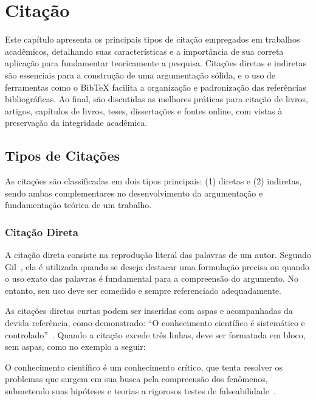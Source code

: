 \documentclass[
    12pt
    ,oneside
    ,a4paper
    ,chapter=TITLE
    ,section=TITLE
    ,sumario=abnt-6027-2012]{abntex2}
\begin{document}
\chapter{Citação}
\label{cap:citacao}

Este capítulo apresenta os principais tipos de citação empregados em trabalhos acadêmicos, detalhando suas características e a importância de sua correta aplicação para fundamentar teoricamente a pesquisa. Citações diretas e indiretas são essenciais para a construção de uma argumentação sólida, e o uso de ferramentas como o BibTeX facilita a organização e padronização das referências bibliográficas. Ao final, são discutidas as melhores práticas para citação de livros, artigos, capítulos de livros, teses, dissertações e fontes online, com vistas à preservação da integridade acadêmica.

\section{Tipos de Citações}

As citações são classificadas em dois tipos principais: (1) diretas e (2) indiretas, sendo ambas complementares no desenvolvimento da argumentação e fundamentação teórica de um trabalho.

\subsection{Citação Direta}

A citação direta consiste na reprodução literal das palavras de um autor. Segundo Gil~\cite{gil}, ela é utilizada quando se deseja destacar uma formulação precisa ou quando o uso exato das palavras é fundamental para a compreensão do argumento. No entanto, seu uso deve ser comedido e sempre referenciado adequadamente.

As citações diretas curtas podem ser inseridas com aspas e acompanhadas da devida referência, como demonstrado: ``O conhecimento científico é sistemático e controlado''~\cite{gil}. Quando a citação excede três linhas, deve ser formatada em bloco, sem aspas, como no exemplo a seguir:

\begin{citacao}
    O conhecimento científico é um conhecimento crítico, que tenta resolver os problemas que surgem em sua busca pela compreensão dos fenômenos, submetendo suas hipóteses e teorias a rigorosos testes de falseabilidade~\cite{gil}.
\end{citacao}
\end{document}
